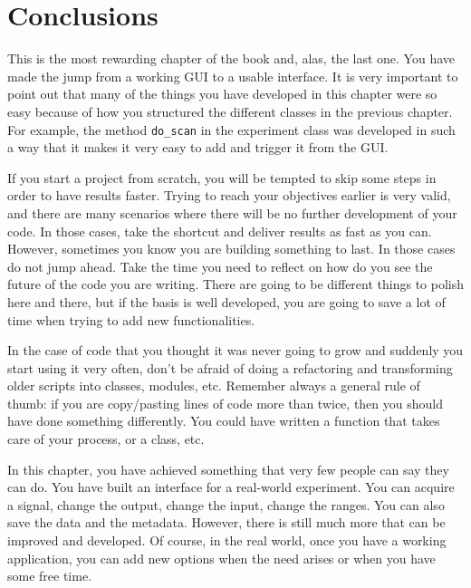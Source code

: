 
\section{Conclusions}\label{conclusions}
This is the most rewarding chapter of the book and, alas, the last one.
You have made the jump from a working {GUI} to a usable interface. It is
very important to point out that many of the things you have developed
in this chapter were so easy because of how you structured the different
classes in the previous chapter. For example, the method
\texttt{do\_scan} in the experiment class was developed in such a way
that it makes it very easy to add and trigger it from the {GUI}.

If you start a project from scratch, you will be tempted to skip some
steps in order to have results faster. Trying to reach your objectives
earlier is very valid, and there are many scenarios where there will be
no further development of your code. In those cases, take the shortcut
and deliver results as fast as you can. However, sometimes you know you
are building something to last. In those cases do not jump ahead. Take
the time you need to reflect on how do you see the future of the code
you are writing. There are going to be different things to polish here
and there, but if the basis is well developed, you are going to save a
lot of time when trying to add new functionalities.

In the case of code that you thought it was never going to grow and
suddenly you start using it very often, don't be afraid of doing a
refactoring and transforming older scripts into classes, modules, etc.
Remember always a general rule of thumb: if you are copy/pasting lines
of code more than twice, then you should have done something
differently. You could have written a function that takes care of your
process, or a class, etc.

In this chapter, you have achieved something that very few people can
say they can do. You have built an interface for a real-world
experiment. You can acquire a signal, change the output, change the
input, change the ranges. You can also save the data and the metadata.
However, there is still much more that can be improved and developed. Of
course, in the real world, once you have a working application, you can
add new options when the need arises or when you have some free time.

